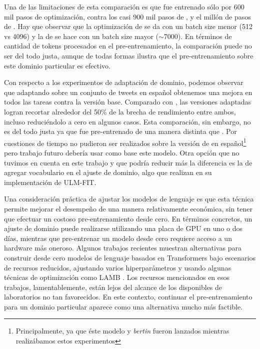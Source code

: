 Una de las limitaciones de esta comparación es que \robertuito{} fue entrenado sólo por 600 mil pasos de optimización, contra los casi 900 mil pasos de \beto{}, y el millón de pasos de \bertweet{}. Hay que observar que la optimización de \beto{} se da con un batch size menor (512 vs \num{4096}) y la de \bertweet{} se hace con un batch size mayor ($\sim$\num{7000}). En términos de cantidad de tokens procesados en el pre-entrenamiento, la comparación puede no ser del todo justa, aunque de todas formas ilustra que el pre-entrenamiento sobre este dominio particular es efectivo.

Con respecto a los experimentos de adaptación de dominio, podemos observar que adaptando \beto{} sobre un conjunto de tweets en español obtenemos una mejora en todos las tareas contra la versión base. Comparado con \robertuito{}, las versiones adaptadas logran recortar alrededor del 50\% de la brecha de rendimiento entre ambos, incluso reduciéndolo a cero en algunos casos. Esta comparación, sin embargo, no es del todo justa ya que \beto{} fue pre-entrenado de una manera distinta que \robertuito{}. Por cuestiones de tiempo no pudieron ser realizados sobre la versión de \roberta{} en español\footnote{Principalmente, ya que éste modelo y \emph{bertin} fueron lanzados mientras realizábamos estos experimentos} pero trabajo futuro debería usar como base este modelo. Otra opción que no tuvimos en cuenta en este trabajo y que podría reducir más la diferencia es la de agregar vocabulario en el ajuste de dominio, algo que \citet{howard-ruder-2018-universal} realizan en su implementación de ULM-FIT.

Una consideración práctica de ajustar los modelos de lenguaje es que esta técnica permite mejorar el desempeño de una manera relativamente económica, sin tener que efectuar un costoso pre-entrenamiento desde cero. En términos concretos, un ajuste de dominio puede realizarse utilizando una placa de GPU en uno o dos días, mientras que pre-entrenar un modelo desde cero requiere acceso a un hardware más oneroso. Algunos trabajos recientes \cite{izsak2021train} muestran alternativas para construir desde cero modelos de lenguaje basados en Transformers bajo escenarios de recursos reducidos, ajustando varios hiperparámetros y usando algunas técnicas de optimización como LAMB \cite{you2019large}. Los recursos mencionados en esos trabajos, lamentablemente, están lejos del alcance de los disponibles de laboratorios no tan favorecidos. En este contexto, continuar el pre-entrenamiento para un dominio particular aparece como una alternativa mucho más factible.

